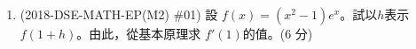 \documentclass[12pt]{article}
\begin{document}
\begin{enumerate}
            \hrulefill
            
            \hrulefill
            
            \hrulefill
            
            \hrulefill

            \hrulefill
            
            \hrulefill
            
            \hrulefill
            
            \hrulefill
            
            \hrulefill
            
            \hrulefill
            
            \hrulefill
            
            \hrulefill
            
            \hrulefill
            
            \hrulefill
            
            \hrulefill
            
            \hrulefill
            
            \hrulefill
            
            \hrulefill
            
            \hrulefill
            
            \hrulefill
            
            \hrulefill
            
            \hrulefill
            
            \hrulefill
            
            \hrulefill
            
            \hrulefill
            
            \hrulefill
            
            \hrulefill
            
        \pagebreak
        \item (2018-DSE-MATH-EP(M2) \#01) 設 $f(x)=(x^2-1)e^x$。試以$h$表示 $f(1+h)$。由此，從基本原理求 $f'(1)$的值。\hfill(6 分)
        
        \hrulefill
            
            \hrulefill
            
            \hrulefill
            
            \hrulefill
            
            \hrulefill
            

\end{enumerate}
\end{document}
